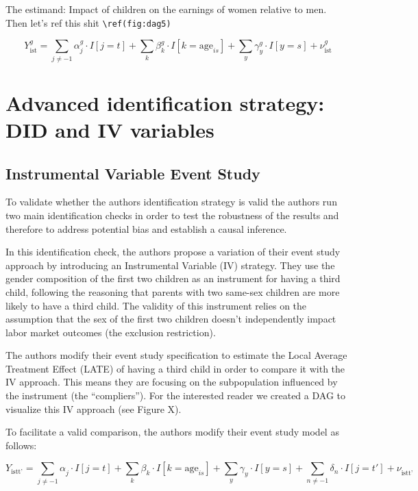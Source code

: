 \documentclass[
]{article}
\begin{document}
The estimand: Impact of children on the earnings of women relative to
men. Then let's ref this shit \texttt{\textbackslash{}ref(fig:dag5)}

\[Y^{g}_{\text{ist}} = \sum_{j \neq -1} \alpha^{g}_{j} \cdot I[j = t] + \sum_k \beta^{g}_{k} \cdot I[k = \text{age}_{is}] + \sum_y \gamma^{g}_{y} \cdot I[y = s] + \nu^{g}_{\text{ist}}
\]

\hypertarget{advanced-identification-strategy-did-and-iv-variables}{%
\section{Advanced identification strategy: DID and IV
variables}\label{advanced-identification-strategy-did-and-iv-variables}}

\hypertarget{instrumental-variable-event-study}{%
\subsection{Instrumental Variable Event
Study}\label{instrumental-variable-event-study}}

To validate whether the authors identification strategy is valid the
authors run two main identification checks in order to test the
robustness of the results and therefore to address potential bias and
establish a causal inference.

In this identification check, the authors propose a variation of their
event study approach by introducing an Instrumental Variable (IV)
strategy. They use the gender composition of the first two children as
an instrument for having a third child, following the reasoning that
parents with two same-sex children are more likely to have a third
child. The validity of this instrument relies on the assumption that the
sex of the first two children doesn't independently impact labor market
outcomes (the exclusion restriction).

The authors modify their event study specification to estimate the Local
Average Treatment Effect (LATE) of having a third child in order to
compare it with the IV approach. This means they are focusing on the
subpopulation influenced by the instrument (the ``compliers''). For the
interested reader we created a DAG to visualize this IV approach (see
Figure X).

To facilitate a valid comparison, the authors modify their event study
model as follows:

\[Y^{}_{\text{istt'}} = \sum_{j \neq -1} \alpha^{}_{j} \cdot I[j = t] + \sum_k \beta^{}_{k} \cdot I[k = \text{age}_{is}] + \sum_y \gamma^{}_{y} \cdot I[y = s] + \sum_{n \neq -1} \delta^{}_{n} \cdot I[j = t'] + \nu^{}_{\text{istt'}}
\]
\end{document}
